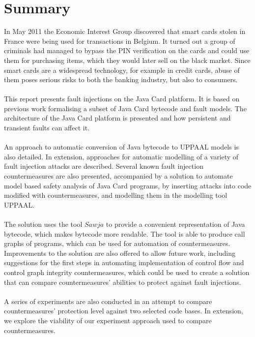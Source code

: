 \chapter*{Summary}
In May 2011 the Economic Interest Group discovered that smart cards stolen in France were being used for transactions in Belgium. It turned out a group of criminals had managed to bypass the PIN verification on the cards and could use them for purchasing items, which they would later sell on the black market. Since smart cards are a widespread technology, for example in credit cards, abuse of them poses serious risks to both the banking industry, but also to consumers.\\\\
This report presents fault injections on the Java Card platform. It is based on previous work formalising a subset of Java Card bytecode and fault models. The architecture of the Java Card platform is presented and how persistent and transient faults can affect it.\\\\
An approach to automatic conversion of Java bytecode to UPPAAL models is also detailed. In extension, approaches for automatic modelling of a variety of fault injection attacks are described.
Several known fault injection countermeasures are also presented, accompanied by a solution to automate model based safety analysis of Java Card programs, by inserting attacks into code modified with countermeasures, and modelling them in the modelling tool UPPAAL.\\\\
The solution uses the tool $Sawja$ to provide a convenient representation of Java bytecode, which makes bytecode more readable. The tool is able to produce call graphs of programs, which can be used for automation of countermeasures. Improvements to the solution are also offered to allow future work, including suggestions for the first steps in automating implementation of control flow and control graph integrity countermeasures, which could be used to create a solution that can compare countermeasures' abilities to protect against fault injections.\\\\
A series of experiments are also conducted in an attempt to compare countermeasures' protection level against two selected code bases. In extension, we explore the viability of our experiment approach used to compare countermeasures.